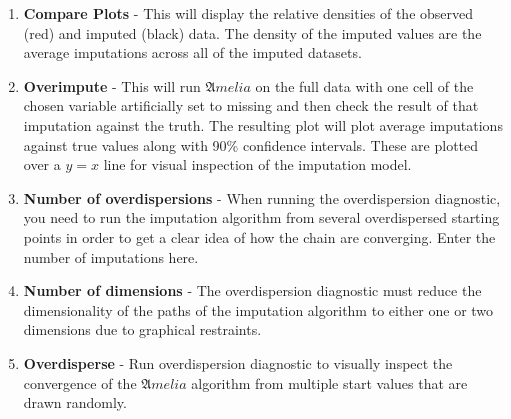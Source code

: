 \documentclass[12pt,titlepage]{article}
\newcommand{\Amelia}{\ensuremath{\mathfrak Amelia} }
\begin{document}
\begin{enumerate}
\item \textbf{Compare Plots} - This will display the relative
  densities of the observed (red) and imputed (black) data.  The
  density of the imputed values are the average imputations across all
  of the imputed datasets.
\item \textbf{Overimpute} - This will run \Amelia on the full data
  with one cell of the chosen variable artificially set to missing and
  then check the result of that imputation against the truth.  The
  resulting plot will plot average imputations against true values
  along with 90\% confidence intervals.  These are plotted over a
  $y=x$ line for visual inspection of the imputation model.
\item \textbf{Number of overdispersions} - When running the
  overdispersion diagnostic, you need to run the imputation algorithm
  from several overdispersed starting points in order to get a clear
  idea of how the chain are converging.  Enter the number of
  imputations here.
\item \textbf{Number of dimensions} - The overdispersion diagnostic
  must reduce the dimensionality of the paths of the imputation
  algorithm to either one or two dimensions due to graphical
  restraints.
\item \textbf{Overdisperse} - Run overdispersion diagnostic to
  visually inspect the convergence of the \Amelia algorithm from
  multiple start values that are drawn randomly.
\end{enumerate}


\bibsep=0in

\end{document}
